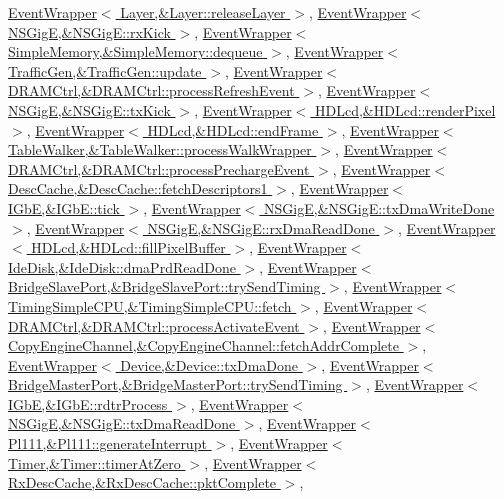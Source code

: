 \hyperlink{classEventWrapper_a6490f765a824ced1cc94979609fe7e07}{EventWrapper$<$ Layer,\&Layer::releaseLayer $>$}, \hyperlink{classEventWrapper_a6490f765a824ced1cc94979609fe7e07}{EventWrapper$<$ NSGigE,\&NSGigE::rxKick $>$}, \hyperlink{classEventWrapper_a6490f765a824ced1cc94979609fe7e07}{EventWrapper$<$ SimpleMemory,\&SimpleMemory::dequeue $>$}, \hyperlink{classEventWrapper_a6490f765a824ced1cc94979609fe7e07}{EventWrapper$<$ TrafficGen,\&TrafficGen::update $>$}, \hyperlink{classEventWrapper_a6490f765a824ced1cc94979609fe7e07}{EventWrapper$<$ DRAMCtrl,\&DRAMCtrl::processRefreshEvent $>$}, \hyperlink{classEventWrapper_a6490f765a824ced1cc94979609fe7e07}{EventWrapper$<$ NSGigE,\&NSGigE::txKick $>$}, \hyperlink{classEventWrapper_a6490f765a824ced1cc94979609fe7e07}{EventWrapper$<$ HDLcd,\&HDLcd::renderPixel $>$}, \hyperlink{classEventWrapper_a6490f765a824ced1cc94979609fe7e07}{EventWrapper$<$ HDLcd,\&HDLcd::endFrame $>$}, \hyperlink{classEventWrapper_a6490f765a824ced1cc94979609fe7e07}{EventWrapper$<$ TableWalker,\&TableWalker::processWalkWrapper $>$}, \hyperlink{classEventWrapper_a6490f765a824ced1cc94979609fe7e07}{EventWrapper$<$ DRAMCtrl,\&DRAMCtrl::processPrechargeEvent $>$}, \hyperlink{classEventWrapper_a6490f765a824ced1cc94979609fe7e07}{EventWrapper$<$ DescCache,\&DescCache::fetchDescriptors1 $>$}, \hyperlink{classEventWrapper_a6490f765a824ced1cc94979609fe7e07}{EventWrapper$<$ IGbE,\&IGbE::tick $>$}, \hyperlink{classEventWrapper_a6490f765a824ced1cc94979609fe7e07}{EventWrapper$<$ NSGigE,\&NSGigE::txDmaWriteDone $>$}, \hyperlink{classEventWrapper_a6490f765a824ced1cc94979609fe7e07}{EventWrapper$<$ NSGigE,\&NSGigE::rxDmaReadDone $>$}, \hyperlink{classEventWrapper_a6490f765a824ced1cc94979609fe7e07}{EventWrapper$<$ HDLcd,\&HDLcd::fillPixelBuffer $>$}, \hyperlink{classEventWrapper_a6490f765a824ced1cc94979609fe7e07}{EventWrapper$<$ IdeDisk,\&IdeDisk::dmaPrdReadDone $>$}, \hyperlink{classEventWrapper_a6490f765a824ced1cc94979609fe7e07}{EventWrapper$<$ BridgeSlavePort,\&BridgeSlavePort::trySendTiming $>$}, \hyperlink{classEventWrapper_a6490f765a824ced1cc94979609fe7e07}{EventWrapper$<$ TimingSimpleCPU,\&TimingSimpleCPU::fetch $>$}, \hyperlink{classEventWrapper_a6490f765a824ced1cc94979609fe7e07}{EventWrapper$<$ DRAMCtrl,\&DRAMCtrl::processActivateEvent $>$}, \hyperlink{classEventWrapper_a6490f765a824ced1cc94979609fe7e07}{EventWrapper$<$ CopyEngineChannel,\&CopyEngineChannel::fetchAddrComplete $>$}, \hyperlink{classEventWrapper_a6490f765a824ced1cc94979609fe7e07}{EventWrapper$<$ Device,\&Device::txDmaDone $>$}, \hyperlink{classEventWrapper_a6490f765a824ced1cc94979609fe7e07}{EventWrapper$<$ BridgeMasterPort,\&BridgeMasterPort::trySendTiming $>$}, \hyperlink{classEventWrapper_a6490f765a824ced1cc94979609fe7e07}{EventWrapper$<$ IGbE,\&IGbE::rdtrProcess $>$}, \hyperlink{classEventWrapper_a6490f765a824ced1cc94979609fe7e07}{EventWrapper$<$ NSGigE,\&NSGigE::txDmaReadDone $>$}, \hyperlink{classEventWrapper_a6490f765a824ced1cc94979609fe7e07}{EventWrapper$<$ Pl111,\&Pl111::generateInterrupt $>$}, \hyperlink{classEventWrapper_a6490f765a824ced1cc94979609fe7e07}{EventWrapper$<$ Timer,\&Timer::timerAtZero $>$}, \hyperlink{classEventWrapper_a6490f765a824ced1cc94979609fe7e07}{EventWrapper$<$ RxDescCache,\&RxDescCache::pktComplete $>$}, 